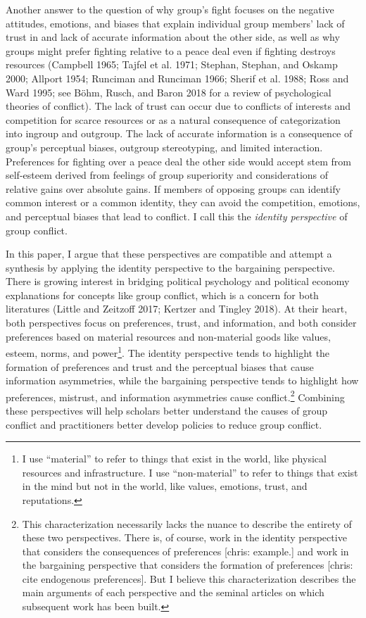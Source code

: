 \documentclass[11pt]{article}
\begin{document}
Another answer to the question of why group's fight focuses on the
negative attitudes, emotions, and biases that explain individual group
members' lack of trust in and lack of accurate information about the
other side, as well as why groups might prefer fighting relative to a
peace deal even if fighting destroys resources (Campbell 1965; Tajfel et
al. 1971; Stephan, Stephan, and Oskamp 2000; Allport 1954; Runciman and
Runciman 1966; Sherif et al. 1988; Ross and Ward 1995; see Böhm, Rusch,
and Baron 2018 for a review of psychological theories of conflict). The
lack of trust can occur due to conflicts of interests and competition
for scarce resources or as a natural consequence of categorization into
ingroup and outgroup. The lack of accurate information is a consequence
of group's perceptual biases, outgroup stereotyping, and limited
interaction. Preferences for fighting over a peace deal the other side
would accept stem from self-esteem derived from feelings of group
superiority and considerations of relative gains over absolute gains. If
members of opposing groups can identify common interest or a common
identity, they can avoid the competition, emotions, and perceptual
biases that lead to conflict. I call this the \emph{identity
perspective} of group conflict.

In this paper, I argue that these perspectives are compatible and
attempt a synthesis by applying the identity perspective to the
bargaining perspective. There is growing interest in bridging political
psychology and political economy explanations for concepts like group
conflict, which is a concern for both literatures (Little and Zeitzoff
2017; Kertzer and Tingley 2018). At their heart, both perspectives focus
on preferences, trust, and information, and both consider preferences
based on material resources and non-material goods like values, esteem,
norms, and power\footnote{I use ``material'' to refer to things that
  exist in the world, like physical resources and infrastructure. I use
  ``non-material'' to refer to things that exist in the mind but not in
  the world, like values, emotions, trust, and reputations.}. The
identity perspective tends to highlight the formation of preferences and
trust and the perceptual biases that cause information asymmetries,
while the bargaining perspective tends to highlight how preferences,
mistrust, and information asymmetries cause conflict.\footnote{This
  characterization necessarily lacks the nuance to describe the entirety
  of these two perspectives. There is, of course, work in the identity
  perspective that considers the consequences of preferences {[}chris:
  example.{]} and work in the bargaining perspective that considers the
  formation of preferences {[}chris: cite endogenous preferences{]}. But
  I believe this characterization describes the main arguments of each
  perspective and the seminal articles on which subsequent work has been
  built.} Combining these perspectives will help scholars better
understand the causes of group conflict and practitioners better develop
policies to reduce group conflict.
\end{document}
